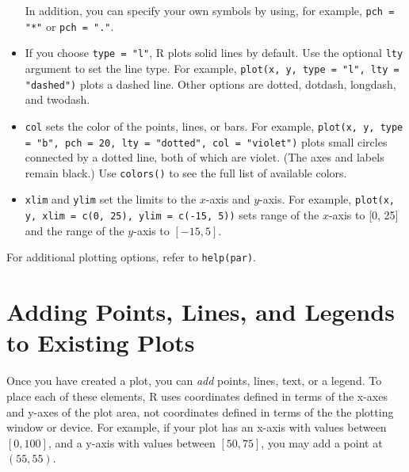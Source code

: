 \documentclass{article}
\begin{document}
\begin{itemize}
In addition, you can specify your own symbols by using, for example,
{\tt pch = "*"} or {\tt pch = "."}.  

\item If you choose {\tt type = "l"}, R plots solid lines by default.
  Use the optional {\tt lty} argument to set the line type.  For
  example, {\tt plot(x, y, type = "l", lty = "dashed")} plots a dashed
  line.  Other options are dotted, dotdash, longdash, and twodash.
  
\item \texttt{col} sets the color of the points, lines, or bars.  For
  example, \texttt{plot(x, y, type = "b", pch = 20, lty = "dotted",
    col = "violet")} plots small circles connected by a dotted line,
  both of which are violet.  (The axes and labels remain black.)  Use
  \texttt{colors()} to see the full list of available colors.
  
\item \texttt{xlim} and {\tt ylim} set the limits to the $x$-axis and
  $y$-axis.  For example, \texttt{plot(x, y, xlim = c(0, 25), ylim =
    c(-15, 5))} sets range of the $x$-axis to [0, 25] and the range of
  the $y$-axis to $[-15, 5]$.
\end{itemize}
For additional plotting options, refer to {\tt help(par)}.

\section{Adding Points, Lines, and Legends to Existing Plots}\label{ss:add}

Once you have created a plot, you can \emph{add} points, lines, text,
or a legend.  To place each of these elements, R uses coordinates
defined in terms of the x-axes and y-axes of the plot area, not
coordinates defined in terms of the the plotting window or device.
For example, if your plot has an x-axis with values between $[0,
100]$, and a y-axis with values between $[50, 75]$, you may add a
point at $(55,55)$.  
\end{document}

